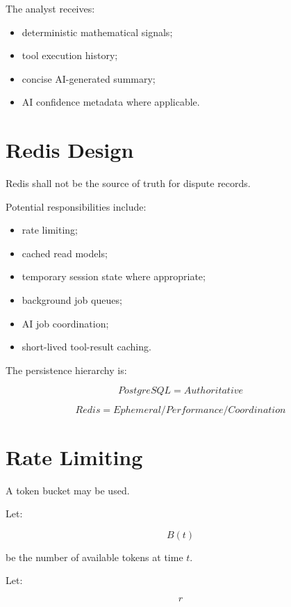 \documentclass[11pt,a4paper]{article}
\begin{document}
The analyst receives:

\begin{itemize}
    \item deterministic mathematical signals;
    \item tool execution history;
    \item concise AI-generated summary;
    \item AI confidence metadata where applicable.
\end{itemize}

\section{Redis Design}

Redis shall not be the source of truth for dispute records.

Potential responsibilities include:

\begin{itemize}
    \item rate limiting;
    \item cached read models;
    \item temporary session state where appropriate;
    \item background job queues;
    \item AI job coordination;
    \item short-lived tool-result caching.
\end{itemize}

The persistence hierarchy is:

\[
\boxed{
PostgreSQL = Authoritative
}
\]

\[
\boxed{
Redis = Ephemeral / Performance / Coordination
}
\]

\section{Rate Limiting}

A token bucket may be used.

Let:

\[
B(t)
\]

be the number of available tokens at time \(t\).

Let:

\[
r
\]
\end{document}
